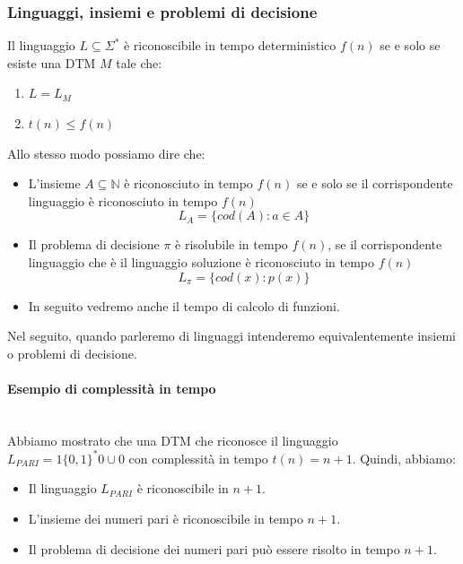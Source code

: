 \documentclass{article}
\begin{document}
\subsubsection{Linguaggi, insiemi e problemi di decisione}
Il linguaggio $L\subseteq \Sigma^*$ è riconoscibile in tempo
deterministico $f(n)$ se e solo se esiste una DTM $M$ tale che:
\begin{enumerate}
    \item $L=L_M$
    \item $t(n)\leq f(n)$
\end{enumerate}
Allo stesso modo possiamo dire che:
\begin{itemize}
    \item L'insieme $A\subseteq\mathbb{N}$ è riconosciuto in tempo $f(n)$
          se e solo se il corrispondente linguaggio è riconosciuto in tempo $f(n)$
          $$L_A=\{cod(A):a\in A\}$$
    \item Il problema di decisione $\pi$ è risolubile in tempo $f(n)$, se
          il corrispondente linguaggio che è il linguaggio soluzione è riconosciuto
          in tempo $f(n)$
          $$L_\pi=\{cod(x):p(x)\}$$
    \item In seguito vedremo anche il tempo di calcolo di funzioni.
\end{itemize}
Nel seguito, quando parleremo di linguaggi intenderemo equivalentemente insiemi
o problemi di decisione.

\paragraph{Esempio di complessità in tempo}\mbox{}\\
Abbiamo mostrato che una DTM che riconosce il linguaggio $L_{PARI}=1\{0,1\}^*0\cup0$
con complessità in tempo $t(n)=n+1$. Quindi, abbiamo:
\begin{itemize}
    \item Il linguaggio $L_{PARI}$ è riconoscibile in $n+1$.
    \item L'insieme dei numeri pari è riconoscibile in tempo $n+1$.
    \item Il problema di decisione dei numeri pari può essere risolto
          in tempo $n+1$.
\end{itemize}
\end{document}
